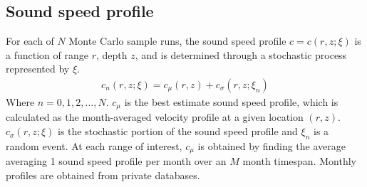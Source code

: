 \subsection{Sound speed profile}
For each of $N$ Monte Carlo sample runs, the sound speed profile
$c = c(r,z;\xi)$ is a function of range $r$, depth $z$, and is
determined through a stochastic process represented by $\xi$.
\begin{align*}%
  c_n(r,z;\xi) = c_\mu(r,z) + c_\sigma(r,z;\xi_n)%
\end{align*}%
Where $n=0,1,2,...,N$. $c_\mu$ is the best estimate sound speed
profile, which is calculated as the month-averaged velocity profile at
a given location $(r,z)$. $c_\sigma(r,z;\xi)$ is the stochastic
portion of the sound speed profile and $\xi_n$ is a random event. At
each range of interest, $c_\mu$ is obtained by finding the average
averaging 1 sound speed profile per month over an $M$ month
timespan. Monthly profiles are obtained from private
databases. %

